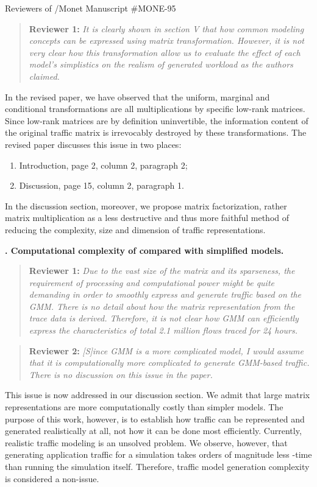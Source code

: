 \documentclass{letter}
\newcounter{topic}
\newcommand{\topic}[1]{
\addtocounter{topic}{1}
\textbf{\arabic{topic}. #1}
}
\newenvironment{reviewer}[1]%
{\begin{quote}\textbf{Reviewer #1:} \it}{\end{quote}}
\begin{document}
\begin{letter}{Reviewers of /Monet Manuscript \#MONE-95}
\begin{reviewer}{1}
It is clearly shown in section V that how common modeling concepts can be expressed using matrix transformation. However, it is not very clear how this transformation allow us to evaluate the effect of each model’s simplistics on the realism of generated workload as the authors claimed.
\end{reviewer}

In the revised paper, we have observed that the uniform, marginal and conditional transformations are all multiplications by specific low-rank matrices.
Since low-rank matrices are by definition uninvertible, the information content of the original traffic matrix is irrevocably destroyed by these transformations.
The revised paper discusses this issue in two places:
\begin{enumerate}
\item Introduction, page 2, column 2, paragraph 2;
\item Discussion, page 15, column 2, paragraph 1.
\end{enumerate}
In the discussion section, moreover, we propose matrix factorization, rather matrix multiplication as a less destructive and thus more faithful method of reducing the complexity, size and dimension of traffic representations.

\topic{Computational complexity of  compared with simplified models.}

\begin{reviewer}{1}
Due to the vast size of the matrix and its sparseness, the requirement of processing and computational power might be quite demanding in order to smoothly express and generate traffic based on the GMM. There is no detail about how the matrix representation from the trace data is derived. Therefore, it is not clear how GMM can efficiently express the 
characteristics of total 2.1 million flows traced for 24 hours.
\end{reviewer}

\begin{reviewer}{2}
[S]ince GMM is a more complicated model, I would assume that it is computationally more complicated to generate GMM-based traffic. There is no discussion on this issue in the paper.
\end{reviewer}

This issue is now addressed in our discussion section.
We admit that large matrix representations are more computationally costly than simpler models.
The purpose of this work, however, is to establish how traffic can be represented and generated realistically at all, not how it can be done most efficiently.
Currently, realistic traffic modeling is an unsolved problem.
We observe, however, that generating application traffic for a simulation takes orders of magnitude less -time than running the simulation itself.
Therefore, traffic model generation complexity is considered a non-issue.


\end{letter}
\end{document}
